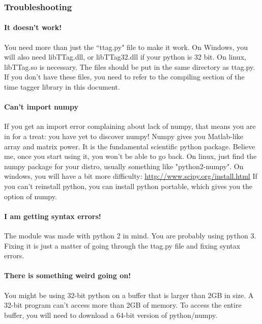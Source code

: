 \documentclass[10pt]{article}
\begin{document}
\subsubsection{Troubleshooting}

\paragraph{It doesn't work!}
You need more than just the ``ttag.py" file to make it work. On Windows, you will also need libTTag.dll, or libTTag32.dll if your python is 32 bit. 
On linux, libTTag.so is necessary. The files should be put in the same directory as ttag.py. If you don't have these files, you need to refer to the
compiling section of the time tagger library in this document.

\paragraph{Can't import numpy}
If you get an import error complaining about lack of numpy, that means you are in for a treat: you have yet to discover numpy! Numpy gives you Matlab-like
array and matrix power. It is the fundamental scientific python package. Believe me, once you start using it, you won't be able to go back.
On linux, just find the numpy package for your distro, usually something like "python2-numpy". On windows, you will have a bit more difficulty: \url{http://www.scipy.org/install.html}
If you can't reinstall python, you can install python portable, which gives you the option of numpy.

\paragraph{I am getting syntax errors!}
The module was made with python 2 in mind. You are probably using python 3. Fixing it is just a matter of going through the ttag.py file and fixing syntax errors.

\paragraph{There is something weird going on!}
You might be using 32-bit python on a buffer that is larger than 2GB in size. A 32-bit program can't access more than 2GB of memory. To access the entire buffer, you will need to download a 64-bit version of python/numpy.
\end{document}
